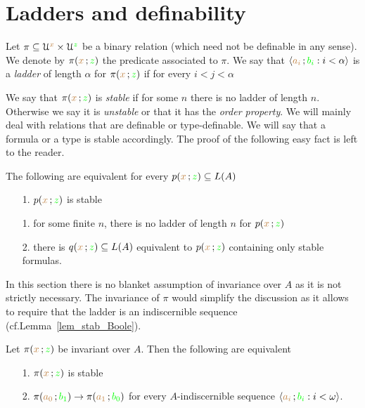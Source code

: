 \section{Ladders and definability}


Let $\pi\subseteq\EuScript U^{\color{brown} x}\times\EuScript U^{\color{green} z}$ be a binary relation (which need not be definable in any sense).
We denote by $\pi({\color{brown} x}\,;{\color{green} z})$ the predicate associated to $\pi$.
We say that $\langle{\color{brown}a_i}\,;{\color{green} b_i} : i<\alpha\rangle$ is a \emph{ladder\/} of length $\alpha$ for $\pi({\color{brown} x}\,;{\color{green} z})$ if for every $i<j<\alpha$


We say that $\pi({\color{brown} x}\,;{\color{green} z})$ is \emph{stable\/} if for some $n$ there is no ladder of length $n$.
Otherwise we say it is \emph{unstable} or that it has the \emph{order property}.
We will mainly deal with relations that are definable or type-definable.
We will say that a formula or a type is stable accordingly.
The proof of the following easy fact is left to the reader.

\begin{fact}\label{}
  The following are equivalent for every $p({\color{brown} x}\,;{\color{green} z})\subseteq L(A)$
  \begin{itemize}
    \item [1.] $p({\color{brown} x}\,;{\color{green} z})$ is stable
    \item [1.] for some finite $n$, there is no ladder of length $n$ for $p({\color{brown} x}\,;{\color{green} z})$
    \item [2.] there is $q({\color{brown} x}\,;{\color{green} z})\subseteq L(A)$ equivalent to $p({\color{brown} x}\,;{\color{green} z})$ containing only stable formulas.
  \end{itemize}
\end{fact}

In this section there is no blanket assumption of invariance over $A$ as it is not strictly necessary.
The invariance of $\pi$ would simplify the discussion as it allows to require that the ladder is an indiscernible sequence (cf.\@ Lemma~\ref{lem_stab_Boole}). 

\begin{theorem}\label{thm_sability_indiscernibility}
  Let $\pi({\color{brown} x}\,;{\color{green} z})$ be invariant over $A$.
  Then the following are equivalent
  \begin{itemize}
    \item[1.] $\pi({\color{brown} x}\,;{\color{green} z})$ is stable
    \item[2.] $\pi({\color{brown} a_0}\,;{\color{green} b_1})\rightarrow\pi({\color{brown} a_1}\,;{\color{green} b_0})$ for every $A$-indiscernible sequence $\langle{\color{brown}a_i}\,;{\color{green} b_i} : i<\omega\rangle$.
  \end{itemize}
\end{theorem}

